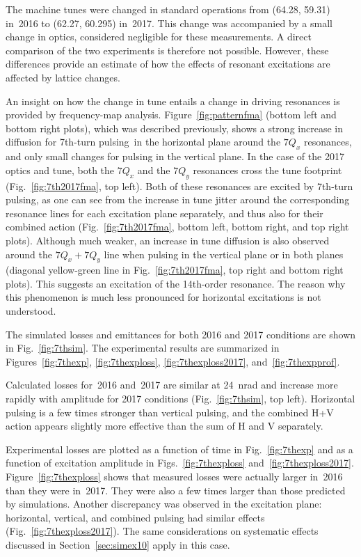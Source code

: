 \documentclass[
prstab
,reprint
,linenumbers
,longbibliography
,preprintnumbers
,showkeys
,amsfonts,amssymb,amsmath
,floatfix
]{revtex4-1}
\newcommand{\seventhtp}{7th-turn pulsing}
\begin{document}
The machine tunes were changed in standard operations from (64.28,
59.31) in~2016 to (62.27, 60.295) in~2017. This change was accompanied
by a small change in optics, considered negligible for these
measurements. A direct comparison of the two experiments is therefore
not possible. However, these differences provide an estimate of how
the effects of resonant excitations are affected by lattice changes.

An insight on how the change in tune entails a change in driving
resonances is provided by frequency-map analysis.
Figure~\ref{fig:patternfma} (bottom left and bottom right plots),
which was described previously, shows a strong increase in diffusion
for \seventhtp\ in the horizontal plane around the $7Q_x$ resonances,
and only small changes for pulsing in the vertical plane. In the case
of the 2017 optics and tune, both the $7Q_x$ and the $7Q_y$ resonances
cross the tune footprint (Fig.~\ref{fig:7th2017fma}, top left). Both
of these resonances are excited by \seventhtp, as one can see from the
increase in tune jitter around the corresponding resonance lines for
each excitation plane separately, and thus also for their combined
action (Fig.~\ref{fig:7th2017fma}, bottom left, bottom right, and top
right plots). Although much weaker, an increase in tune diffusion is
also observed around the $7Q_x + 7Q_y$ line when pulsing in the
vertical plane or in both planes (diagonal yellow-green line in
Fig.~\ref{fig:7th2017fma}, top right and bottom right plots). This
suggests an excitation of the 14th-order resonance. The reason why
this phenomenon is much less pronounced for horizontal excitations is
not understood.

The simulated losses and emittances for both 2016 and 2017 conditions
are shown in Fig.~\ref{fig:7thsim}. The experimental results are
summarized in Figures~\ref{fig:7thexp}, \ref{fig:7thexploss},
\ref{fig:7thexploss2017}, and~\ref{fig:7thexpprof}.

Calculated losses for~2016 and~2017 are similar at 24~nrad and
increase more rapidly with amplitude for 2017 conditions
(Fig.~\ref{fig:7thsim}, top left). Horizontal pulsing is a few times
stronger than vertical pulsing, and the combined H+V action appears
slightly more effective than the sum of H and V separately.

Experimental losses are plotted as a function of time in
Fig.~\ref{fig:7thexp} and as a function of excitation amplitude in
Figs.~\ref{fig:7thexploss}
and~\ref{fig:7thexploss2017}. Figure~\ref{fig:7thexploss} shows that
measured losses were actually larger in~2016 than they were
in~2017. They were also a few times larger than those predicted by
simulations. Another discrepancy was observed in the excitation plane:
horizontal, vertical, and combined pulsing had similar effects
(Fig.~\ref{fig:7thexploss2017}). The same considerations on systematic
effects discussed in Section~\ref{sec:simex10} apply in this case.
\end{document}
